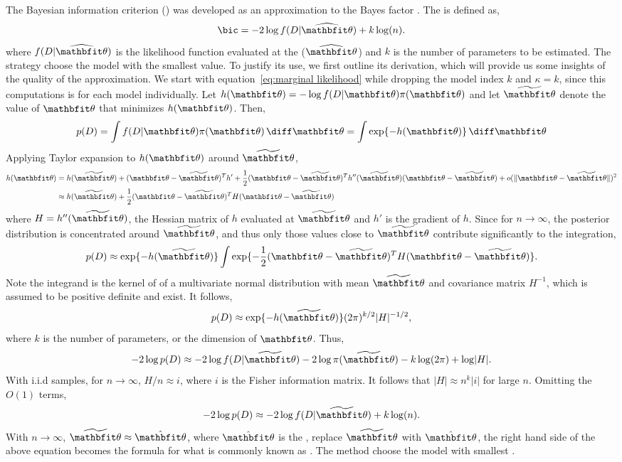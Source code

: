 \documentclass[11pt, hyper, bib, fontset=Minion]{marticle}
\begin{document}
The Bayesian information criterion (\bic) was developed as an approximation to
the Bayes factor \parencite{Schwarz:1978uv}. The \bic is defined as,
\begin{equation}
  \text{\bic} = -2\log f(D|\hbth) + k\log(n).
\end{equation}
where $f(D|\hbth)$ is the likelihood function evaluated at the \mle ($\hbth$)
and $k$ is the number of parameters to be estimated. The \bic strategy choose
the model with the smallest \bic value. To justify its use, we first outline
its derivation, which will provide us some insights of the quality of the
approximation. We start with equation~\eqref{eq:marginal likelihood} while
dropping the model index $k$ and $\kappa=k$, since this computations is for
each model individually. Let $h(\bth) = - \log f(D|\bth)\pi(\bth)$ and let
$\tbth$ denote the value of $\bth$ that minimizes $h(\bth)$. Then,
\begin{equation}
  p(D) = \int f(D|\bth)\pi(\bth)\dd\bth = \int\exp\{-h(\bth)\}\dd\bth
\end{equation}
Applying Taylor expansion to $h(\bth)$ around $\tbth$,
\begin{align}
  h(\bth)
  &= h(\tbth) + (\bth - \tbth)^T h'
  + \frac{1}{2}(\bth - \tbth)^T h''(\tbth) (\bth - \tbth)
  + o(\lVert \bth - \tbth \rVert)^2 \notag\\
  &\approx h(\tbth) + \frac{1}{2}(\bth - \tbth)^T H (\bth - \tbth)
\end{align}
where $H = h''(\tbth)$, the Hessian matrix of $h$ evaluated at $\tbth$ and
$h'$ is the gradient of $h$. Since for $n\to\infty$, the posterior
distribution is concentrated around $\tbth$, and thus only those values close
to $\tbth$ contribute significantly to the integration,
\begin{equation}
  p(D)\approx\exp\{-h(\tbth)\}
  \int\exp\{-\frac{1}{2}(\bth - \tbth)^TH(\bth - \tbth)\}.
\end{equation}
Note the integrand is the kernel of of a multivariate normal distribution with
mean $\tbth$ and covariance matrix $H^{-1}$, which is assumed to be positive
definite and exist. It follows,
\begin{equation}
  p(D) \approx \exp\{-h(\tbth)\} (2\pi)^{k/2} \lvert H \rvert^{-1/2},
\end{equation}
where $k$ is the number of parameters, or the dimension of $\bth$. Thus,
\begin{equation}
  -2\log p(D) \approx
  -2\log f(D|\tbth) - 2\log\pi(\tbth) - k\log(2\pi) + \log\lvert H \rvert.
  \label{eq:bic approx}
\end{equation}
With i.i.d samples, for $n\to\infty$, $H/n \approx i$, where $i$ is the Fisher
information matrix. It follows that $\lvert H \rvert \approx n^k \lvert i
\rvert$ for large $n$. Omitting the $O(1)$ terms,
\begin{equation}
  -2\log p(D) \approx -2\log f(D|\tbth) + k\log(n).
\end{equation}
With $n\to\infty$, $\tbth\approx\hat{\bth}$, where $\hat{\bth}$ is the \mle,
replace $\tbth$ with $\hat{\bth}$, the right hand side of the above equation
becomes the formula for what is commonly known as \bic. The \bic method choose
the model with smallest \bic.
\end{document}
